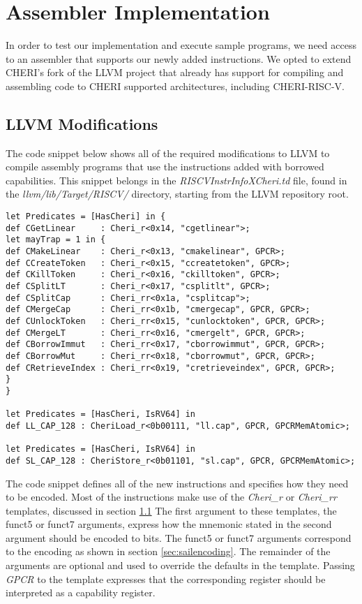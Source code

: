 \chapter{Assembler Implementation}
In order to test our implementation and execute sample programs, we need access to an assembler that supports our newly added instructions. We opted to extend CHERI's fork of the LLVM project that already has support for compiling and assembling code to CHERI supported architectures, including CHERI-RISC-V.

\section{LLVM Modifications}
The code snippet below shows all of the required modifications to LLVM to compile assembly programs that use the instructions added with borrowed capabilities. This snippet belongs in the \textit{RISCVInstrInfoXCheri.td} file, found in the \textit{llvm/lib/Target/RISCV/} directory, starting from the LLVM repository root.

\begin{verbatim}
let Predicates = [HasCheri] in {
def CGetLinear     : Cheri_r<0x14, "cgetlinear">;
let mayTrap = 1 in {
def CMakeLinear    : Cheri_r<0x13, "cmakelinear", GPCR>;
def CCreateToken   : Cheri_r<0x15, "ccreatetoken", GPCR>;
def CKillToken     : Cheri_r<0x16, "ckilltoken", GPCR>;
def CSplitLT       : Cheri_r<0x17, "csplitlt", GPCR>;
def CSplitCap      : Cheri_rr<0x1a, "csplitcap">;
def CMergeCap      : Cheri_rr<0x1b, "cmergecap", GPCR, GPCR>;
def CUnlockToken   : Cheri_rr<0x15, "cunlocktoken", GPCR, GPCR>;
def CMergeLT       : Cheri_rr<0x16, "cmergelt", GPCR, GPCR>;
def CBorrowImmut   : Cheri_rr<0x17, "cborrowimmut", GPCR, GPCR>;
def CBorrowMut     : Cheri_rr<0x18, "cborrowmut", GPCR, GPCR>;
def CRetrieveIndex : Cheri_rr<0x19, "cretrieveindex", GPCR, GPCR>;
}
}

let Predicates = [HasCheri, IsRV64] in
def LL_CAP_128 : CheriLoad_r<0b00111, "ll.cap", GPCR, GPCRMemAtomic>;

let Predicates = [HasCheri, IsRV64] in
def SL_CAP_128 : CheriStore_r<0b01101, "sl.cap", GPCR, GPCRMemAtomic>;
\end{verbatim}

The code snippet defines all of the new instructions and specifies how they need to be encoded. Most of the instructions make use of the \textit{Cheri\_r} or \textit{Cheri\_rr} templates, discussed in section \ref{} %
The first argument to these templates, the funct5 or funct7 arguments, express how the mnemonic stated in the second argument should be encoded to bits. The funct5 or funct7 arguments correspond to the encoding as shown in section \ref{sec:sailencoding}. The remainder of the arguments are optional and used to override the defaults in the template. Passing \textit{GPCR} to the template expresses that the corresponding register should be interpreted as a capability register.

